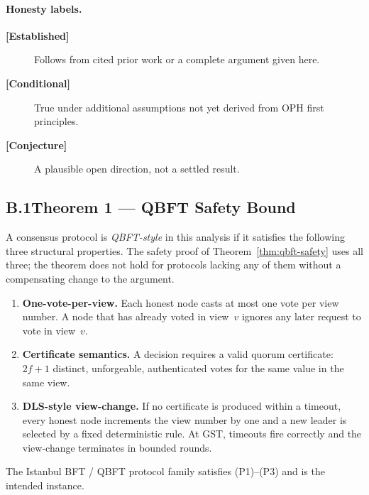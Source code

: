 \paragraph{Honesty labels.}
\begin{description}
  \item[\textbf{[Established]}] Follows from cited prior work or a complete
        argument given here.
  \item[\textbf{[Conditional]}] True under additional assumptions not yet
        derived from \textrm{OPH} first principles.
  \item[\textbf{[Conjecture]}] A plausible open direction, not a settled result.
\end{description}

\subsection*{B.1\quad Theorem 1 --- QBFT Safety Bound}

\begin{definition}
\label{def:qbft-style}
A consensus protocol is \emph{QBFT-style} in this analysis if it satisfies
the following three structural properties.
The safety proof of Theorem~\ref{thm:qbft-safety} uses all three;
the theorem does not hold for protocols lacking any of them without a
compensating change to the argument.
\begin{enumerate}[(P1)]
  \item \textbf{One-vote-per-view.}
        Each honest node casts at most one vote per view number.
        A node that has already voted in view~$v$ ignores any later request
        to vote in view~$v$.
  \item \textbf{Certificate semantics.}
        A decision requires a valid quorum certificate: $2f+1$ distinct,
        unforgeable, authenticated votes for the same value in the same view.
  \item \textbf{DLS-style view-change.}
        If no certificate is produced within a timeout, every honest node
        increments the view number by one and a new leader is selected by a
        fixed deterministic rule.  At \textrm{GST}, timeouts fire correctly
        and the view-change terminates in bounded rounds.
\end{enumerate}
The Istanbul BFT / QBFT protocol family
\cite{Moniz2020,Saltini}
satisfies (P1)--(P3) and is the intended instance.
\end{definition}


